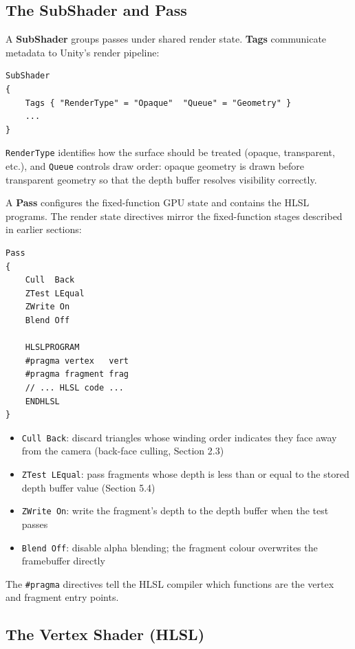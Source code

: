 \documentclass[11pt]{article}
\begin{document}
\subsection{The SubShader and Pass}

A \textbf{SubShader} groups passes under shared render state. \textbf{Tags} communicate metadata to Unity's render pipeline:

\begin{lstlisting}
SubShader
{
    Tags { "RenderType" = "Opaque"  "Queue" = "Geometry" }
    ...
}
\end{lstlisting}

\texttt{RenderType} identifies how the surface should be treated (opaque, transparent, etc.), and \texttt{Queue} controls draw order: opaque geometry is drawn before transparent geometry so that the depth buffer resolves visibility correctly.

A \textbf{Pass} configures the fixed-function GPU state and contains the HLSL programs. The render state directives mirror the fixed-function stages described in earlier sections:

\begin{lstlisting}
Pass
{
    Cull  Back
    ZTest LEqual
    ZWrite On
    Blend Off

    HLSLPROGRAM
    #pragma vertex   vert
    #pragma fragment frag
    // ... HLSL code ...
    ENDHLSL
}
\end{lstlisting}

\begin{itemize}
    \item \texttt{Cull Back}: discard triangles whose winding order indicates they face away from the camera (back-face culling, Section 2.3)
    \item \texttt{ZTest LEqual}: pass fragments whose depth is less than or equal to the stored depth buffer value (Section 5.4)
    \item \texttt{ZWrite On}: write the fragment's depth to the depth buffer when the test passes
    \item \texttt{Blend Off}: disable alpha blending; the fragment colour overwrites the framebuffer directly
\end{itemize}

The \texttt{\#pragma} directives tell the HLSL compiler which functions are the vertex and fragment entry points.


\subsection{The Vertex Shader (HLSL)}
\end{document}
